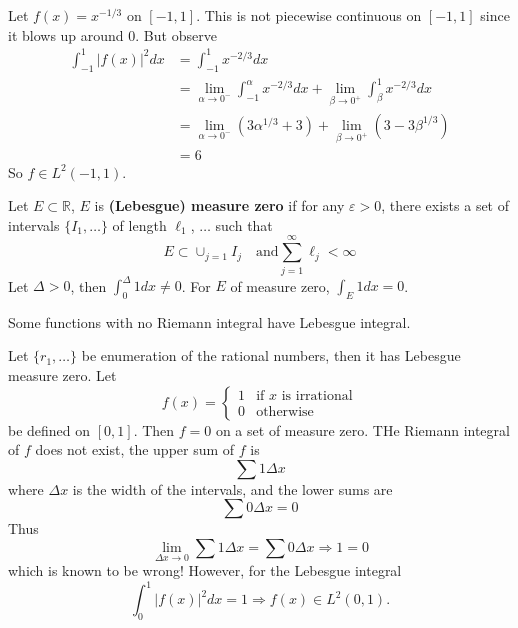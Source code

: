 \begin{ex}
Let $f(x)=x^{-1/3}$ on $[-1,1]$. This is not piecewise
continuous on $[-1,1]$ since it blows up around $0$. But
observe
\begin{align*}
\int^{1}_{-1}|f(x)|^{2}dx &= \int^{1}_{-1}x^{-2/3}dx\\
&=\lim_{\alpha\to 0^{-}}\int^{\alpha}_{-1}x^{-2/3}dx +
\lim_{\beta\to0^{+}}\int^{1}_{\beta}x^{-2/3}dx\\
&=\lim_{\alpha\to0^{-}}(3\alpha^{1/3}+3)+\lim_{\beta\to0^{+}}(3-3\beta^{1/3})\\
&= 6
\end{align*}
So $f\in L^{2}(-1,1)$.
\end{ex}

\begin{defn}
Let $E\subset\mathbb{R}$, $E$ is \textbf{(Lebesgue) measure
  zero} if for any
$\varepsilon>0$, there exists a set of intervals
$\{I_1,\ldots\}$ of length $\ell_1$, $\ldots$ such that
\begin{equation}
E\subset\cup_{j=1}I_{j}\quad\text{and
}\sum^{\infty}_{j=1}\ell_{j}<\infty
\end{equation}
Let $\Delta>0$, then $\int^{\Delta}_{0}1dx\neq 0$. For $E$
of measure zero, $\int_{E}1dx=0$.
\end{defn}

\begin{rmk}
Some functions with no Riemann integral have Lebesgue
integral.
\end{rmk}

\begin{ex}
Let $\{r_1,\ldots\}$ be enumeration of the rational numbers,
then it has Lebesgue measure zero. Let
\begin{equation}
f(x) = \begin{cases}1&\text{if $x$ is
    irrational}\\0&\text{otherwise}\end{cases}
\end{equation}
be defined on $[0,1]$. Then $f=0$ on a set of measure
zero. THe Riemann integral of $f$ does not exist, the upper
sum of $f$ is
\begin{equation}
\sum 1 \Delta x
\end{equation}
where $\Delta x$ is the width of the intervals, and the
lower sums are
\begin{equation}
\sum 0\Delta x = 0
\end{equation}
Thus
\begin{equation}
\lim_{\Delta x\to 0}\sum 1\Delta x = \sum 0\Delta
x\Rightarrow 1=0
\end{equation}
which is known to be wrong! However, for the Lebesgue
integral
\begin{equation}
\int^{1}_{0}|f(x)|^{2}dx = 1\Rightarrow f(x)\in L^{2}(0,1).
\end{equation}
\end{ex}

